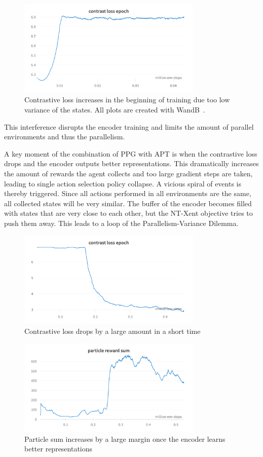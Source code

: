 \documentclass{article}
\begin{document}
\begin{figure}[h]
  \centering
  \includegraphics[width = 250pt]{contrast_loss.png}
  \caption{Contrastive loss increases in the beginning of training due too low variance of the states. All plots
  are created with WandB~\cite{wandb}.}
\end{figure}

\noindent This interference disrupts the encoder training and limits the amount of
parallel environments and thus the parallelism.

\noindent A key moment of the combination of PPG with APT is when the contrastive loss drops and
the encoder outputs better representations. This dramatically increases the amount of rewards the agent
collects and too large gradient steps are taken, leading to single action selection policy collapse. A vicious spiral of events is thereby triggered.
Since all actions performed in all environments are the same, all collected states
will be very similar. The buffer of the encoder becomes filled with states that are 
very close to each other, but the NT-Xent objective tries to push them away.
This leads to a loop of the Parallelism-Variance Dilemma. 
\begin{figure}[h]
  \centering
  \includegraphics[width = 250pt]{contrast_loss_drop.png}
  \caption{Contrastive loss drops by a large amount in a short time}
\end{figure}

\begin{figure}[h]
  \centering
  \includegraphics[width = 250pt]{particle_sum_contrast_loss_drop.png}
  \caption{Particle sum increases by a large margin once the encoder learns better representations}
\end{figure}
\end{document}
